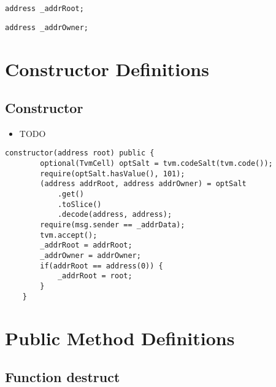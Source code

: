 \begin{lstlisting}[firstnumber=9]
    address _addrRoot;
\end{lstlisting}

\begin{lstlisting}[firstnumber=10]
    address _addrOwner;
\end{lstlisting}

\section{Constructor Definitions}


\subsection{Constructor}

\begin{itemize}
\item TODO
\end{itemize}

\begin{lstlisting}[firstnumber=13]
    constructor(address root) public {
        optional(TvmCell) optSalt = tvm.codeSalt(tvm.code());
        require(optSalt.hasValue(), 101);
        (address addrRoot, address addrOwner) = optSalt
            .get()
            .toSlice()
            .decode(address, address);
        require(msg.sender == _addrData);
        tvm.accept();
        _addrRoot = addrRoot;
        _addrOwner = addrOwner;
        if(addrRoot == address(0)) {
            _addrRoot = root;
        }
    }
\end{lstlisting}

\section{Public Method Definitions}


\subsection{Function destruct}

